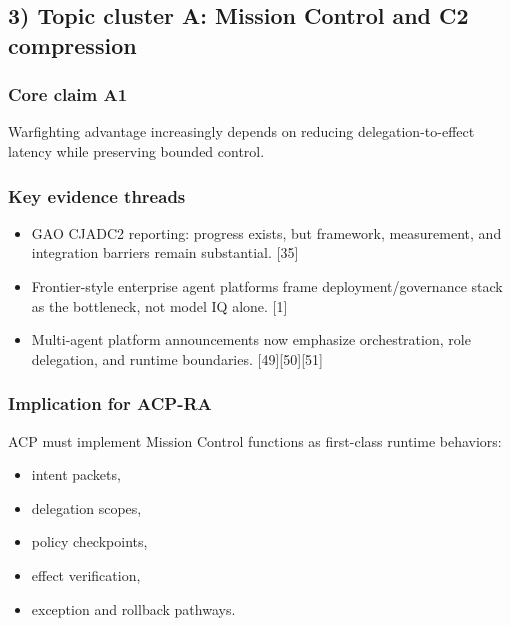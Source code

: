 \documentclass[11pt]{article}
\begin{document}
\hypertarget{topic-cluster-a-mission-control-and-c2-compression}{%
\subsection{3) Topic cluster A: Mission Control and C2
compression}\label{topic-cluster-a-mission-control-and-c2-compression}}

\hypertarget{core-claim-a1}{%
\subsubsection{Core claim A1}\label{core-claim-a1}}

Warfighting advantage increasingly depends on reducing
delegation-to-effect latency while preserving bounded control.

\hypertarget{key-evidence-threads}{%
\subsubsection{Key evidence threads}\label{key-evidence-threads}}

\begin{itemize}
\tightlist
\item
  GAO CJADC2 reporting: progress exists, but framework, measurement, and
  integration barriers remain substantial. {[}35{]}
\item
  Frontier-style enterprise agent platforms frame deployment/governance
  stack as the bottleneck, not model IQ alone. {[}1{]}
\item
  Multi-agent platform announcements now emphasize orchestration, role
  delegation, and runtime boundaries. {[}49{]}{[}50{]}{[}51{]}
\end{itemize}

\hypertarget{implication-for-acp-ra}{%
\subsubsection{Implication for ACP-RA}\label{implication-for-acp-ra}}

ACP must implement Mission Control functions as first-class runtime
behaviors:

\begin{itemize}
\tightlist
\item
  intent packets,
\item
  delegation scopes,
\item
  policy checkpoints,
\item
  effect verification,
\item
  exception and rollback pathways.
\end{itemize}
\end{document}
